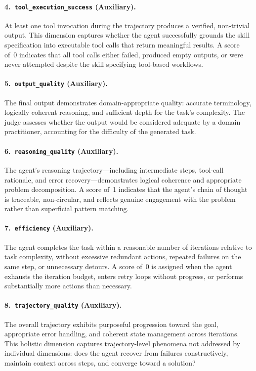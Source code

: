 \paragraph{4.\ \texttt{tool\_execution\_success} (Auxiliary).}
At least one tool invocation during the trajectory produces a verified, non-trivial output.
This dimension captures whether the agent successfully grounds the skill specification into executable tool calls that return meaningful results.
A score of~0 indicates that all tool calls either failed, produced empty outputs, or were never attempted despite the skill specifying tool-based workflows.

\paragraph{5.\ \texttt{output\_quality} (Auxiliary).}
The final output demonstrates domain-appropriate quality: accurate terminology, logically coherent reasoning, and sufficient depth for the task's complexity.
The judge assesses whether the output would be considered adequate by a domain practitioner, accounting for the difficulty of the generated task.

\paragraph{6.\ \texttt{reasoning\_quality} (Auxiliary).}
The agent's reasoning trajectory---including intermediate steps, tool-call rationale, and error recovery---demonstrates logical coherence and appropriate problem decomposition.
A score of~1 indicates that the agent's chain of thought is traceable, non-circular, and reflects genuine engagement with the problem rather than superficial pattern matching.

\paragraph{7.\ \texttt{efficiency} (Auxiliary).}
The agent completes the task within a reasonable number of iterations relative to task complexity, without excessive redundant actions, repeated failures on the same step, or unnecessary detours.
A score of~0 is assigned when the agent exhausts the iteration budget, enters retry loops without progress, or performs substantially more actions than necessary.

\paragraph{8.\ \texttt{trajectory\_quality} (Auxiliary).}
The overall trajectory exhibits purposeful progression toward the goal, appropriate error handling, and coherent state management across iterations.
This holistic dimension captures trajectory-level phenomena not addressed by individual dimensions: does the agent recover from failures constructively, maintain context across steps, and converge toward a solution?

